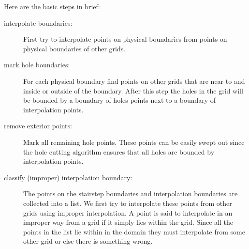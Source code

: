Here are the basic steps in brief:
\begin{description}
  \item[interpolate boundaries:] First try to interpolate points on physical boundaries
      from points on physical boundaries of other grids. 
  \item[mark hole boundaries:] For each physical boundary find points on other grids that are
      near to and inside or outside of the boundary. After this step the holes in the grid will
      be bounded by a boundary of holes points next to a boundary of interpolation points.
  \item[remove exterior points:] Mark all remaining hole points. These points can be easily swept
       out since the hole cutting algorithm ensures that all holes are bounded by interpolation 
       points. 
  \item[classify (improper) interpolation boundary:] 
        The points on the stairstep boundaries 
     and interpolation boundaries are collected into a list. We first try
     to interpolate these points from other grids using improper interpolation. 
     A point is said to interpolate in an improper way from a grid if it simply lies within
     the grid. Since all the points in the list lie within in the domain they must
     interpolate from some other grid or else there is something wrong. 

\end{description}
